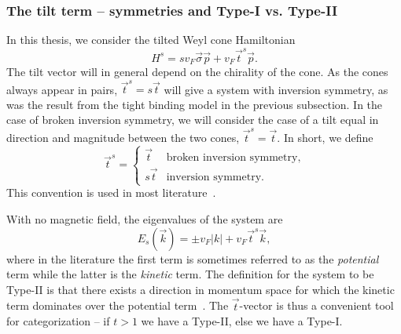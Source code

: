

\subsubsection{The tilt term -- symmetries and Type-I vs.\! Type-II}
In this thesis, we consider the tilted Weyl cone Hamiltonian
\[
H^s = s v_F \vec{\sigma} \vec{p} + v_F \vec{t}^s \vec{p}.
\]
The tilt vector will in general depend on the chirality of the cone.
As the cones always appear in pairs, \( \vec{t}^s = s \vec{t} \) will give a system with inversion symmetry, as was the result from the tight binding model in the previous subsection.
In the case of broken inversion symmetry, we will consider the case of a tilt equal in direction and magnitude between the two cones, \( \vec{t}^s = \vec{t} \).
In short, we define
\begin{equation}
  \vec{t}^s =
  \begin{cases}
    \vec{t} & \text{broken inversion symmetry},\\
    s \vec{t} & \text{inversion symmetry}.
  \end{cases}\label{eq:11}
\end{equation}
This convention is used in most literature~\cite{vanderwurffMagnetovorticalThermoelectricTransport2019,ferreirosAnomalousNernstThermal2017}.

With no magnetic field, the eigenvalues of the system are
\begin{equation}
  \label{eq:12}
  E_s(\vec{k})
  = \pm v_F |k| + v_F \vec{t}^s \vec{k},
\end{equation}
where in the literature the first term is sometimes referred to as the \emph{potential} term while the latter is the \emph{kinetic} term.
The definition for the system to be Type-II is that there exists a direction in momentum space for which the kinetic term dominates over the potential term~\cite{soluyanovTypeIIWeylSemimetals2015}.
The \(\vec{t}\)-vector is thus a convenient tool for categorization -- if \(t > 1\) we have a Type-II, else we have a Type-I.


